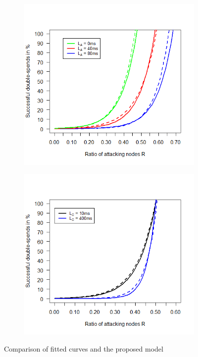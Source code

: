 \documentclass[a4paper,12pt,twoside]{report}
\begin{document}
\begin{figure}
\begin{subfigure}{.495\textwidth}
\end{subfigure}
\begin{subfigure}{.495\textwidth}
  \centering
  \includegraphics[width=\linewidth]{Comparison/AttLatency/attrat.png}
\end{subfigure}
\begin{subfigure}{.495\textwidth}
  \centering
  \includegraphics[width=\linewidth]{Comparison/ConnLatency/conrat.png}
\end{subfigure}
\caption{Comparison of fitted curves and the proposed model}
\label{comp}
\end{figure}
\end{document}
